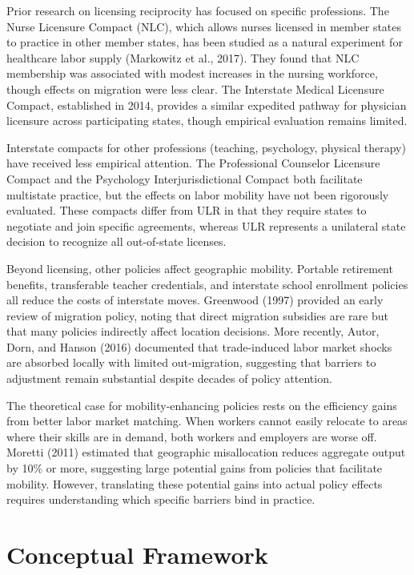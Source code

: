 \documentclass[12pt]{article}
\begin{document}
Prior research on licensing reciprocity has focused on specific professions. The Nurse Licensure Compact (NLC), which allows nurses licensed in member states to practice in other member states, has been studied as a natural experiment for healthcare labor supply (Markowitz et al., 2017). They found that NLC membership was associated with modest increases in the nursing workforce, though effects on migration were less clear. The Interstate Medical Licensure Compact, established in 2014, provides a similar expedited pathway for physician licensure across participating states, though empirical evaluation remains limited.

Interstate compacts for other professions (teaching, psychology, physical therapy) have received less empirical attention. The Professional Counselor Licensure Compact and the Psychology Interjurisdictional Compact both facilitate multistate practice, but the effects on labor mobility have not been rigorously evaluated. These compacts differ from ULR in that they require states to negotiate and join specific agreements, whereas ULR represents a unilateral state decision to recognize all out-of-state licenses.

Beyond licensing, other policies affect geographic mobility. Portable retirement benefits, transferable teacher credentials, and interstate school enrollment policies all reduce the costs of interstate moves. Greenwood (1997) provided an early review of migration policy, noting that direct migration subsidies are rare but that many policies indirectly affect location decisions. More recently, Autor, Dorn, and Hanson (2016) documented that trade-induced labor market shocks are absorbed locally with limited out-migration, suggesting that barriers to adjustment remain substantial despite decades of policy attention.

The theoretical case for mobility-enhancing policies rests on the efficiency gains from better labor market matching. When workers cannot easily relocate to areas where their skills are in demand, both workers and employers are worse off. Moretti (2011) estimated that geographic misallocation reduces aggregate output by 10\% or more, suggesting large potential gains from policies that facilitate mobility. However, translating these potential gains into actual policy effects requires understanding which specific barriers bind in practice.

\section{Conceptual Framework}
\end{document}

